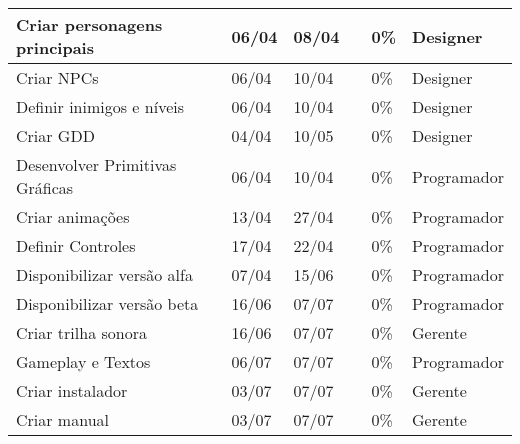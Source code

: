 \documentclass[a4paper, 11pt]{article} %
\begin{document}
\begin{table}[h]
\begin{tabular}{|l|l|l|l|l|l|}
Criar personagens principais                 & 06/04           & 08/04        &                    & 0\%                & Designer             \\ \hline
Criar NPCs                                   & 06/04           & 10/04        &                    & 0\%                & Designer             \\ \hline
Definir inimigos e níveis                    & 06/04           & 10/04        &                    & 0\%                & Designer             \\ \hline
Criar GDD                                    & 04/04           & 10/05        &                    & 0\%                & Designer             \\ \hline
Desenvolver Primitivas Gráficas              & 06/04           & 10/04        &                    & 0\%                & Programador          \\ \hline
Criar animações                              & 13/04           & 27/04        &                    & 0\%                & Programador          \\ \hline
Definir Controles                            & 17/04           & 22/04        &                    & 0\%                & Programador          \\ \hline
Disponibilizar versão alfa                   & 07/04           & 15/06        &                    & 0\%                & Programador          \\ \hline
Disponibilizar versão beta                   & 16/06           & 07/07        &                    & 0\%                & Programador          \\ \hline
Criar trilha sonora                          & 16/06           & 07/07        &                    & 0\%                & Gerente              \\ \hline
Gameplay e Textos                            & 06/07           & 07/07        &                    & 0\%                & Programador          \\ \hline
Criar instalador                             & 03/07           & 07/07        &                    & 0\%                & Gerente              \\ \hline
Criar manual                                 & 03/07           & 07/07        &                    & 0\%                & Gerente              \\ \hline

\end{tabular}
\end{table}
\end{document}

